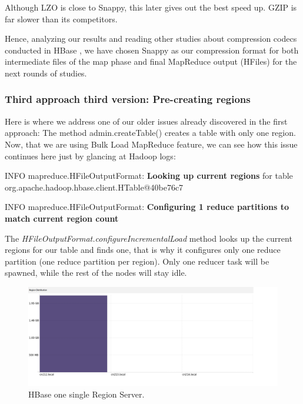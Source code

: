 Although LZO is close to Snappy, this later gives out the best speed up. GZIP is far slower than its competitors.

Hence, analyzing our results and reading other studies about compression codecs conducted in HBase \cite{CompressionComparison}, we have chosen Snappy as our compression format for both intermediate files of the map phase and final MapReduce output (HFiles) for the next rounds of studies.




\subsubsection{Third approach third version: Pre-creating regions}
Here is where we address one of our older issues already discovered in the first approach: The method admin.createTable() creates a table with only one region. Now, that we are using Bulk Load MapReduce feature, we can see how this issue continues here just by glancing at Hadoop logs:

\bigskip

INFO mapreduce.HFileOutputFormat: \textbf{Looking up current regions} for table org.apache.hadoop.hbase.client.HTable@40be76c7
\par
INFO mapreduce.HFileOutputFormat: \textbf{Configuring 1 reduce partitions to match current region count}

\bigskip

The \textit{HFileOutputFormat.configureIncrementalLoad} method looks up the current regions for our table and finds one, that is why it configures  only one reduce partition (one reduce partition per region). Only one reducer task will be spawned, while the rest of the nodes will stay idle.




\begin{figure}[htb]
\centering
\includegraphics[width=1\textwidth,height=0.34\textheight]{./images/1regionserveractive1.png}
\caption{HBase one single Region Server.} \label{fig:oneRegion}
\end{figure}



